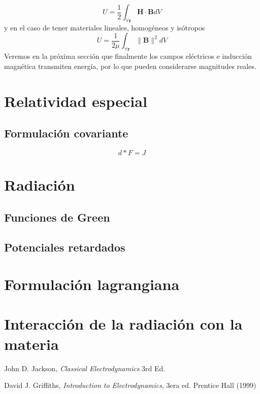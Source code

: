 \documentclass[11pt,a4paper]{article}
\numberwithin{equation}{section}
\begin{document}
\begin{equation}
    U = \frac{1}{2} \int_{\forall \textbf{r}} \textbf{H} \cdot \textbf{B} dV
    \label{eq:m_energia_campo}
\end{equation}
y en el caso de tener materiales lineales, homogéneos y isótropos
\begin{equation}
    U = \frac{1}{2\mu} \int_{\forall \textbf{r}} \|\textbf{B}\|^2 dV
\end{equation}
Veremos en la próxima sección que finalmente los campos eléctricos e inducción magnética transmiten energía, por lo que pueden considerarse magnitudes reales.




\section{Relatividad especial}

\subsection{Formulación covariante}

\begin{equation}
    d*F = J
\end{equation}

\section{Radiación}

\subsection{Funciones de Green}

\subsection{Potenciales retardados}

\section{Formulación lagrangiana}

\section{Interacción de la radiación con la materia}

\begin{thebibliography}{9}
        John D. Jackson,
        \emph{Classical Electrodynamics}
        3rd Ed.
        
        David J. Griffiths, 
        \emph{Introduction to Electrodynamics},
        3era ed.
        Prentice Hall
        (1999)
\end{thebibliography}
\end{document}
